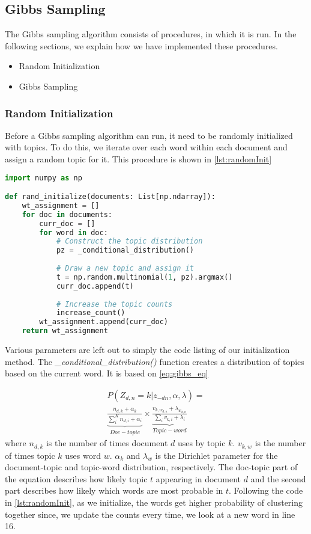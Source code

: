 \subsection{Gibbs Sampling}\label{sec:appendix_gibbs}
The Gibbs sampling algorithm consists of procedures, in which it is run.
In the following sections, we explain how we have implemented these procedures.
\begin{itemize}
	\item Random Initialization
	\item Gibbs Sampling
\end{itemize}

\subsubsection{Random Initialization}
Before a Gibbs sampling algorithm can run, it need to be randomly initialized with topics.
To do this, we iterate over each word within each document and assign a random topic for it.
This procedure is shown in \autoref{lst:randomInit}
\begin{lstlisting}[language=Python, caption=Random Initialization,label={lst:randomInit}]
import numpy as np

def rand_initialize(documents: List[np.ndarray]):
	wt_assignment = []
	for doc in documents:
		curr_doc = []
		for word in doc:
			# Construct the topic distribution
			pz = _conditional_distribution()
			
			# Draw a new topic and assign it
			t = np.random.multinomial(1, pz).argmax()
			curr_doc.append(t)
			
			# Increase the topic counts
			increase_count()
		wt_assignment.append(curr_doc)
	return wt_assignment
\end{lstlisting}

Various parameters are left out to simply the code listing of our initialization method.
The \emph{\_conditional\_distribution()} function creates a distribution of topics based on the current word.
It is based on \autoref{eq:gibbs_eq}

\begin{equation}\label{eq:gibbs_eq}
	\begin{split}
		P(Z_{d,n} = k |z_{-dn}, \alpha, \lambda) = \\
		\underbrace{\frac{n_{d,k} + \alpha_{k}}{\sum_{i}^{K} n_{d,i} + \alpha_i}}_{Doc-topic} \times
		\underbrace{\frac{v_{k, w_{d,n}} + \lambda_{w_{d,n}}}{\sum_{i} v_{k,i} + \lambda_i}}_{Topic-word}
	\end{split}
\end{equation}
where $n_{d,k}$ is the number of times document $d$ uses by topic $k$.
$v_{k,w}$ is the number of times topic $k$ uses word $w$.
$\alpha_k$ and $\lambda_w$ is the Dirichlet parameter for the document-topic and topic-word distribution, respectively.
The doc-topic part of the equation describes how likely topic $t$ appearing in document $d$ and the second part describes how likely which words are most probable in $t$.
Following the code in \autoref{lst:randomInit}, as we initialize, the words get higher probability of clustering together since, we update the counts every time, we look at a new word in line 16.

